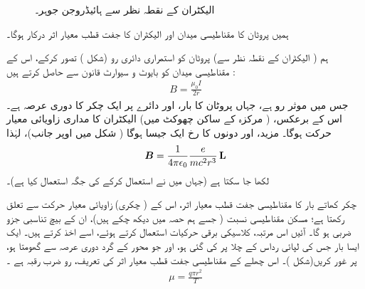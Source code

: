 \begin{figure}
\centering
{}
\caption{الیکٹران کے نقطہ نظر سے ہائیڈروجن جوہر۔}
\label{شکل_غیر_تابع_اضطراب_جوہر_الیکٹران_نقطہ_نظر}
\end{figure}

ہمیں پروٹان کا مقناطیسی میدان    اور الیکٹران کا جفت قطب معیار اثر  درکار ہوگا۔ 

\quad
{}  ہم ( الیکٹران کے نقطہ نظر سے)  پروٹان کو استمراری دائری  رو (شکل )   تصور کرکے،  اس کے مقناطیسی میدان کو بایوٹ و سيوارٹ قانون سے حاصل کرتے ہیں :
\begin{align*} 
B = \frac{\mu_0 I}{2r}
\end{align*}
جس میں موثر رو  ہے،  جہاں  پروٹان کا بار،  اور  دائرے پر ایک چکر کا دوری عرصہ  ہے۔  اس کے برعکس،    ( مرکزہ کے ساکن  چھوکٹ میں)  الیکٹران کا مداری زاویائی معیار حرکت  ہوگا۔  مزید،   اور  دونوں کا رخ ایک   جیسا ہوگا ( شکل  میں اوپر جانب)،  لہٰذا
\begin{align}\label{مساوات_غیر_مضطرب_اندرونی_مقناطیسی_میدان}
{\ensuremath{{\boldsymbol{B}}}} = \frac{1}{4 \pi \epsilon_0} \frac{e}{mc^2 r^3} \operatorname{\mathbf{L}}
\end{align}
لکھا جا سکتا ہے (جہاں میں نے  استعمال کرکے  کی جگہ  استعمال کیا ہے)۔ 

\quad
{}   چکر کھاتے بار کا مقناطیسی جفت قطب معیار اثر،  اس کے ( چکری)  زاویائی معیار حرکت سے تعلق رکھتا ہے؛   مسکن مقناطیسی  نسبت    ( جسے ہم   حصہ    میں دیکھ چکے ہیں)،   ان کے بیچ تناسبی جزو ضربی ہو گا۔  آئیں اس مرتبہ،   کلاسیکی برقی حرکیات استعمال کرتے ہوئے،  اسے اخذ کرتے ہیں۔ ایک ایسا بار  جس کی لپائی  رداس  کے چلا پر  کی گئی ہو،  اور جو محور کے گرد دوری عرصہ  سے گھومتا ہو،  پر غور کریں(شکل  )۔   اس چھلے کے مقناطیسی جفت قطب معیار اثر کی تعریف،  رو  ضرب رقبہ  ہے ۔
\begin{align*}
\mu = \frac{q \pi r^2}{T}
\end{align*}

